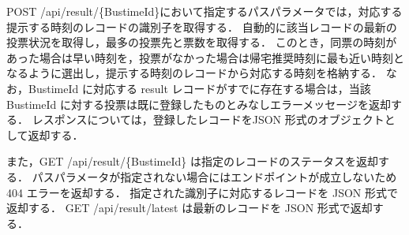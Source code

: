 POST /api/result/\{BustimeId\}において指定するパスパラメータでは，対応する提示する時刻のレコードの識別子を取得する．
自動的に該当レコードの最新の投票状況を取得し，最多の投票先と票数を取得する．
このとき，同票の時刻があった場合は早い時刻を，投票がなかった場合は帰宅推奨時刻に最も近い時刻となるように選出し，提示する時刻のレコードから対応する時刻を格納する．
なお，BustimeId に対応する result レコードがすでに存在する場合は，当該 BustimeId に対する投票は既に登録したものとみなしエラーメッセージを返却する．
レスポンスについては，登録したレコードをJSON 形式のオブジェクトとして返却する．


また，GET /api/result/\{BustimeId\} は指定のレコードのステータスを返却する．
パスパラメータが指定されない場合にはエンドポイントが成立しないため 404 エラーを返却する．
指定された識別子に対応するレコードを JSON 形式で返却する．
GET /api/result/latest は最新のレコードを JSON 形式で返却する．